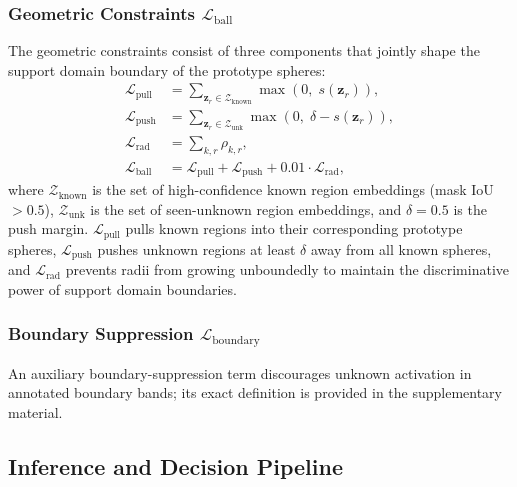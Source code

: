 \documentclass[journal]{IEEEtai}
\newcommand{\bz}{\mathbf{z}}
\begin{document}
\subsubsection{Geometric Constraints \texorpdfstring{$\mathcal{L}_{\text{ball}}$}{L\_ball}}\label{sec:method:loss:ball}

The geometric constraints consist of three components that jointly shape the support
domain boundary of the prototype spheres:
\begin{align}
  \mathcal{L}_{\text{pull}} &= \sum_{\bz_r \in \mathcal{Z}_{\text{known}}} \max\!\left(0,\; s(\bz_r)\right), \label{eq:loss_pull} \\
  \mathcal{L}_{\text{push}} &= \sum_{\bz_r \in \mathcal{Z}_{\text{unk}}} \max\!\left(0,\; \delta - s(\bz_r)\right), \label{eq:loss_push} \\
  \mathcal{L}_{\text{rad}} &= \sum_{k,r} \rho_{k,r}, \label{eq:loss_rad} \\
  \mathcal{L}_{\text{ball}} &= \mathcal{L}_{\text{pull}} + \mathcal{L}_{\text{push}} + 0.01 \cdot \mathcal{L}_{\text{rad}}, \label{eq:loss_ball}
\end{align}
where $\mathcal{Z}_{\text{known}}$ is the set of high-confidence known region embeddings
(mask IoU $> 0.5$), $\mathcal{Z}_{\text{unk}}$ is the set of seen-unknown region
embeddings, and $\delta = 0.5$ is the push margin.
$\mathcal{L}_{\text{pull}}$ pulls known regions into their corresponding prototype
spheres, $\mathcal{L}_{\text{push}}$ pushes unknown regions at least $\delta$ away
from all known spheres, and $\mathcal{L}_{\text{rad}}$ prevents radii from growing
unboundedly to maintain the discriminative power of support domain boundaries.

\subsubsection{Boundary Suppression \texorpdfstring{$\mathcal{L}_{\text{boundary}}$}{L\_boundary}}\label{sec:method:loss:boundary}

An auxiliary boundary-suppression term discourages unknown activation in annotated
boundary bands; its exact definition is provided in the supplementary material.

\subsection{Inference and Decision Pipeline}\label{sec:method:inference}
\end{document}
